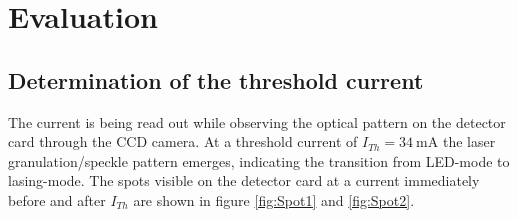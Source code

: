 \newpage
\section{Evaluation}
    \subsection{Determination of the threshold current}
        The current is being read out while observing the
        optical pattern on the detector card through the CCD camera.
        At a threshold current of $I_{Th}=\SI{34}{\milli\ampere}$
        the laser granulation/speckle pattern emerges,
        indicating the transition from LED-mode to lasing-mode.
        The spots visible on the detector card at a current
        immediately before and after $I_{Th}$ are shown in figure \ref{fig:Spot1} and \ref{fig:Spot2}.
